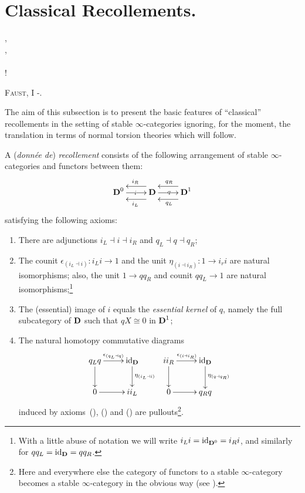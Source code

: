 \section{Classical Recollements.}\label{classical}
\setlength{\epigraphwidth}{.5\textwidth}
\epigraph{
	,\\
	,\\
	\\ 
	!}{\textsc{Faust}, I -.}
\setlength{\epigraphwidth}{\DefaultEpigraphWidth}
The aim of this subsection is to present the basic features of ``classical'' recollements in the setting of stable $\infty$\hyp{}categories ignoring, for the moment, the translation in terms of normal torsion theories which will follow.
\begin{definition}\label{def:recol}
A (\emph{donnée de}) \emph{recollement} consists of the following arrangement of stable $\infty$\hyp{}categories and functors between them:
\[\label{rec}
\xymatrix{
  \D^0	& \D	& \D^1
  \ar|i "1,1";"1,2" 
  \ar@<8pt>^{i_L} "1,2";"1,1" 
  \ar@<-8pt>_{i_R} "1,2";"1,1" 
  \ar|q "1,2";"1,3" 
  \ar@<8pt>^{q_L} "1,3";"1,2" 
  \ar@<-8pt>_{q_R} "1,3";"1,2" 
}
\]
satisfying the following axioms:
\begin{enumerate}
\item There are adjunctions $i_L\dashv i\dashv i_R$ and $q_L\dashv q\dashv q_R$;
\item The counit $\epsilon_{(i_L\dashv i)} \colon i_L i \to 1$ and the unit $\eta_{(i\dashv i_R)}\colon 1\to i_r i$ are natural isomorphisms; also, the unit $1\to qq_R$ and counit $qq_L \to 1$ are natural isomorphisms;\footnote{With a little abuse of notation we will write $i_L i = \text{id}_{\textbf{D}^0} = i_R i$, and similarly for $qq_L = \text{id}_{\textbf{D}} = qq_R$.}
\item The (essential) image of $i$ equals the \emph{essential kernel} of $q$, namely the full subcategory of $\textbf{D}$ such that $qX\cong 0$ in $\textbf{D}^1$;
\item 
The natural homotopy commutative diagrams 
\[
\xymatrix{
  q_L q & \id_\D  & ii_R  & \id_\D \\
  0 & ii_L  & 0 & q_R q
  \ar "1,1";"1,2" ^{\epsilon_{(q_L\dashv q)}}
  \ar "1,1";"2,1" 
  \ar "1,2";"2,2" ^{\eta_{(i_L\dashv i)}}
  \ar "1,3";"1,4" ^{\epsilon_{(i\dashv i_R)}}
  \ar "1,3";"2,3" 
  \ar "1,4";"2,4" ^{\eta_{(q\dashv q_R)}}
  \ar "2,1";"2,2" 
  \ar "2,3";"2,4" 
}
\]
induced by axioms~(), () and ()
are pullouts\footnote{Here and everywhere else the category of functors to a stable $\infty$\hyp{}category becomes a stable $\infty$\hyp{}category in the obvious way (see \cite[ \textbf{1.1.3.1}]{LurieHA}).}.
\end{enumerate}
\end{definition}
